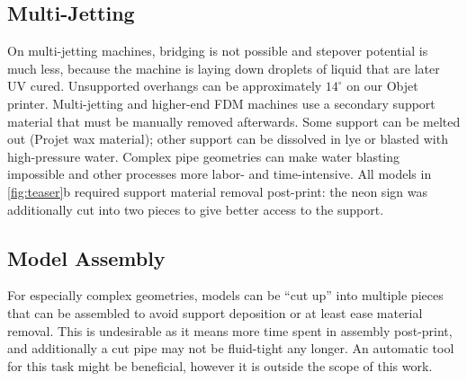 \subsection{Multi-Jetting}
On multi-jetting machines, bridging is not possible and stepover potential is much less, because the machine is laying down droplets of liquid that are later UV cured.  Unsupported overhangs can be approximately $14^{\circ}$ on our Objet printer.  Multi-jetting and higher-end FDM machines use a secondary support material that must be manually removed afterwards. Some support can be melted out (Projet wax material); other support can be dissolved in lye or blasted with high-pressure water. Complex pipe geometries can make water blasting impossible and other processes more labor- and time-intensive.  All models in \ref{fig:teaser}b required support material removal post-print: the neon sign was additionally cut into two pieces to give better access to the support.

\subsection{Model Assembly}
For especially complex geometries, models can be ``cut up'' into multiple pieces that can be assembled to avoid support deposition or at least ease material removal. This is undesirable as it means more time spent in assembly post-print, and additionally a cut pipe may not be fluid-tight any longer.  An automatic tool for this task might be beneficial, however it is outside the scope of this work.